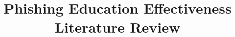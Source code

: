 \documentclass{article}
\begin{document}
\title{Phishing Education Effectiveness Literature Review} \nocite{*}
\maketitle


\end{document}
